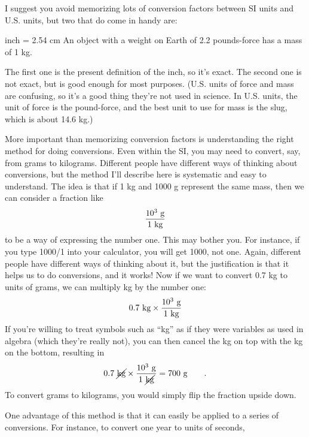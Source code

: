 I suggest you avoid memorizing lots of conversion factors
between SI units and U.S. units, but two that do come in handy are:

\begin{indentedblock}
  inch =  2.54 cm
 \noindent An object with a weight on Earth of 2.2 pounds-force has a mass of 1 kg.
\end{indentedblock}

\noindent The first one is the present definition of the inch, so it's exact. The second one is not exact, but is good enough for most purposes. (U.S. units of force and mass are confusing, so it's a good thing they're not used in science. In U.S. units, the unit of force is the pound-force, and the best unit to use for mass is the slug, which is about 14.6 kg.)

More important than memorizing conversion factors is
understanding the right method for doing conversions. Even
within the SI, you may need to convert, say, from grams to
kilograms. Different people have different ways of thinking
about conversions, but the method I'll describe here is
systematic and easy to understand. The idea is that if 1 kg
and 1000 g represent the same mass, then we can consider a fraction like
\begin{equation*}
  \frac{10^3\ \gunit}{1\ \kgunit}
\end{equation*}
to be a way of expressing the number one. This may bother
you. For instance, if you type 1000/1 into your calculator,
you will get 1000, not one. Again, different people have
different ways of thinking about it, but the justification
is that it helps us to do conversions, and it works! Now if
we want to convert 0.7 kg to units of grams, we can multiply
kg by the number one:
\begin{equation*}
  0.7\ \kgunit \times \frac{10^3\ \gunit}{1\ \kgunit}
\end{equation*}
If you're willing to treat symbols such as ``kg'' as if they
were variables as used in algebra (which they're really
not), you can then cancel the kg on top with the kg on the
bottom, resulting in
\begin{equation*}
  0.7\ \cancel{\kgunit} \times \frac{10^3\ \gunit}{1\ \cancel{\kgunit}}  = 700\ \gunit   \qquad   .
\end{equation*}
To convert grams to kilograms, you would simply flip the
fraction upside down.

One advantage of this method is that it can easily be
applied to a series of conversions. For instance, to convert
one year to units of seconds,

